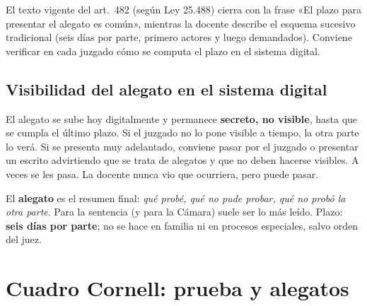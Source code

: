 \documentclass[12pt,oneside]{book}
\begin{document}
\begin{note}
El texto vigente del art.\ 482 (según Ley 25.488) cierra con la frase «El plazo para presentar el alegato es común», mientras la docente describe el esquema sucesivo tradicional (seis días por parte, primero actores y luego demandados). Conviene verificar en cada juzgado cómo se computa el plazo en el sistema digital.
\end{note}

\subsection{Visibilidad del alegato en el sistema digital}

El alegato se sube hoy digitalmente y permanece \textbf{secreto, no visible}, hasta que se cumpla el último plazo. Si el juzgado no lo pone visible a tiempo, la otra parte lo verá. Si se presenta muy adelantado, conviene pasar por el juzgado o presentar un escrito advirtiendo que se trata de alegatos y que no deben hacerse visibles. A veces se les pasa. La docente nunca vio que ocurriera, pero puede pasar.

\begin{important}
El \textbf{alegato} es el resumen final: \textit{qué probé, qué no pude probar, qué no probó la otra parte}. Para la sentencia (y para la Cámara) suele ser lo más leído. Plazo: \textbf{seis días por parte}; no se hace en familia ni en procesos especiales, salvo orden del juez.
\end{important}

\section{Cuadro Cornell: prueba y alegatos}
\end{document}
